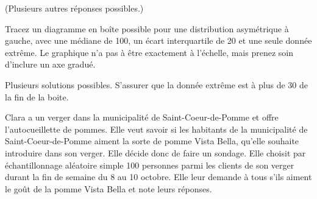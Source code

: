 \begin{questions}
\begin{parts}
\begin{solution}
(Plusieurs autres réponses possibles.)
\end{solution}

\end{parts}

\newpage 

\question[4]
Tracez un diagramme en boîte possible pour une distribution asymétrique à gauche, avec une médiane de 100, un écart interquartile de 20 et une seule donnée
extrême. Le graphique n'a pas à être exactement à l'échelle, mais prenez soin d'inclure
un axe gradué.

Plusieurs solutions possibles. S'assurer que la donnée extrême est à plus de 30 de la fin de la boite. 

\vspace{8cm}

\question Clara a un verger dans la municipalité de Saint-Coeur-de-Pomme et offre l'autocueillette de pommes. Elle veut savoir si les habitants de la municipalité de Saint-Coeur-de-Pomme aiment la sorte de pomme Vista Bella, qu'elle souhaite introduire dans son verger. Elle décide donc de faire un sondage. Elle choisit par échantillonnage aléatoire simple 100 personnes parmi les clients de son verger durant la fin de semaine du 8 au 10 octobre. Elle leur demande à tous s'ils aiment le goût de la pomme Vista Bella et note leurs réponses. \\

\end{questions}
